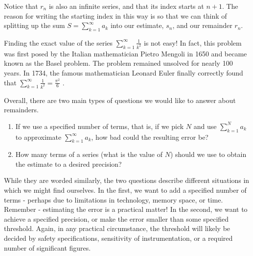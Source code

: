 \documentclass{ximera}
\begin{document}
Notice that $r_n$ is also an infinite series, and that its index starts at $n+1$.  The reason for writing the starting index in this way is so that we can think of splitting up the sum $S = \sum \limits_{k=1}^\infty a_k$ into our estimate, $s_n$, and our remainder $r_n$.

\begin{image}
  \end{image} 

\begin{remark}
Finding the exact value of the series $\sum_{k=1}^{\infty} \frac{1}{k^2}$ is not easy!  In fact, this problem was first posed by the Italian mathematician Pietro Mengoli in 1650 and became known as the Basel problem. The problem remained unsolved for nearly 100 years. In 1734, the famous mathematician Leonard Euler finally correctly found that $\sum_{k=1}^{\infty} \frac{1}{k^2} = \frac{\pi^2}{6}$ .  
\end{remark}

Overall, there are two main types of questions we would like to answer about remainders.
\begin{enumerate}
    \item If we use a specified number of terms, that is, if we pick $N$ and use $\sum_{k=1}^N a_k$ to approximate $\sum_{k=1}^{\infty} a_k$, how bad could the resulting error be?
    \item How many terms of a series (what is the value of $N$) should we use to obtain the estimate to a desired precision?
\end{enumerate}

While they are worded similarly, the two questions describe different situations in which we might find ourselves.  In the first, we want to add a specified number of terms - perhaps due to limitations in technology, memory space, or time.  Remember - estimating the error is a practical matter!  In the second, we want to achieve a specified precision, or make the error smaller than some specified threshold.  Again, in any practical circumstance, the threshold will likely be decided by safety specifications, sensitivity of instrumentation, or a required number of significant figures. 
\end{document}
